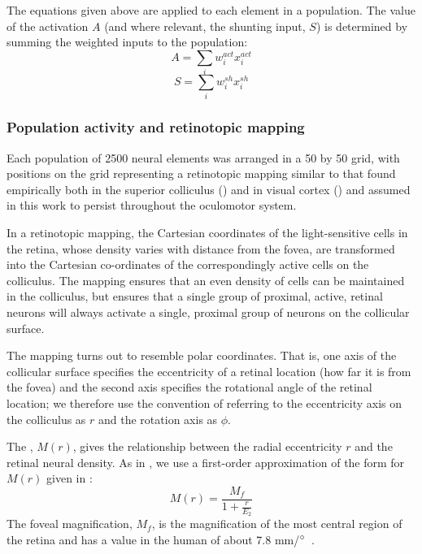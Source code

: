 \documentclass{frontiersSCNS}
\begin{document}
The equations given above are applied to each element in a
population. The value of the activation $A$ (and where relevant, the
shunting input, $S$) is determined by summing the weighted
inputs to the population:
\begin{equation}
A = \sum_{i}w_i^{act} x_i^{act}
\end{equation}
\begin{equation}
S = \sum_{i}w_i^{sh} x_i^{sh}
\end{equation}

%
%

\subsubsection{Population activity and retinotopic mapping}

Each population of 2500 neural elements was arranged in a 50 by 50
grid, with positions on the grid representing a retinotopic
mapping similar to that found empirically both in the superior 
colliculus (\cite{ottes_visuomotor_1986}) and in visual cortex (\cite{eric_l._schwartz_computational_1980}) and assumed in
this work to persist throughout the oculomotor system.

In a retinotopic mapping, the Cartesian coordinates of the light-sensitive
cells in the retina, whose density varies with distance from the fovea,
are transformed into the Cartesian co-ordinates of 
the correspondingly active cells on the colliculus. The mapping ensures 
that an even density of cells can be maintained in the colliculus, but 
ensures that a single group of proximal, active, retinal neurons will 
always activate a single, proximal group of neurons on the collicular 
surface.

The mapping turns out to resemble polar coordinates. That is, one 
axis of the collicular surface specifies the eccentricity of
a retinal location (how far it is from the fovea) and the second axis
specifies the rotational angle of the retinal location; we therefore
use the convention 
of referring to the eccentricity axis on the colliculus as $r$ and the 
rotation axis as $\phi$.

The , $M(r)$, gives the relationship
between the
radial eccentricity $r$ and the retinal neural density. As in 
\cite{cope_basal_2017}, we use a first-order approximation of the form
for $M(r)$ given in  \cite{rovamo_estimation_1979}:
\begin{equation} \label{eq:cmf}
M(r) = \frac{M_f}{1+\frac{r}{E_2}}
\end{equation}
The foveal magnification, $M_f$, is the magnification of the most central
region of the retina and has a value in the human of about
7.8 mm/$\degree$~\cite{rovamo_estimation_1979}.
\end{document}
